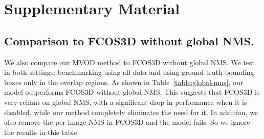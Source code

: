 \section*{Supplementary Material}
\subsection*{Comparison to FCOS3D without global NMS.}
We also compare our MVOD method to FCOS3D without global NMS. We test in both settings: benchmarking using all data and using ground-truth bounding boxes only in the overlap regions. As shown in Table~\ref{table:global-nms}, our model outperforms FCOS3D without global NMS. This suggests that FCOS3D is very reliant on global NMS, with a significant drop in performance when it is disabled, while our method completely eliminates the need for it. In addition, we also remove the per-image NMS in FCOS3D and the model fails. So we ignore the results in this table. 

\begin{table}[t] 
\begin{center}
\caption{Comparisons to FCOS3D without global NMS. \label{table:global-nms}}
\end{center}
\end{table}

